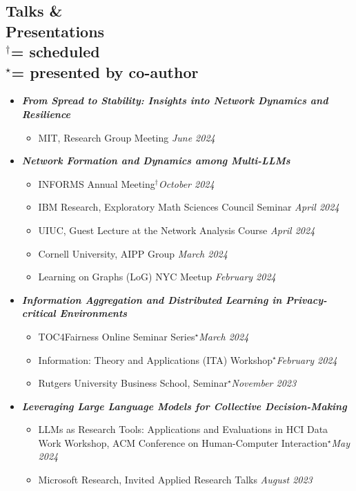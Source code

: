 \documentclass[margin]{res}
\newcommand{\scheduled}[0]{\ensuremath {^\dagger}}
\newcommand{\presentedbycoauthor}[0]{\ensuremath {^{\star}}}
\newcommand{\bemph}[1]{\textbf{\emph{#1}}}
\begin{document}
\begin{resume}
\section{Talks \& \\ Presentations \\
\footnotesize
\scheduled  = \textup{scheduled} \\ \presentedbycoauthor = \textup{presented by co-author}
}

\begin{itemize}[nosep]
	\item \bemph{From Spread to Stability: Insights into Network Dynamics and Resilience}
	\begin{itemize}[nosep]
		\item MIT, Research Group Meeting \hfill \emph{June 2024}
	\end{itemize}

	\item \bemph{Network Formation and Dynamics among Multi-LLMs}
	\begin{itemize}[nosep]
		\item INFORMS Annual Meeting\scheduled \hfill \emph{October 2024}
		\item IBM Research, Exploratory Math Sciences Council Seminar  \hfill \emph{April 2024} 
		\item UIUC, Guest Lecture at the Network Analysis Course \hfill \emph{April 2024}
		\item Cornell University, AIPP Group \hfill \emph{March 2024}
		\item Learning on Graphs (LoG) NYC Meetup \hfill \emph{February 2024}
	\end{itemize}
	
	\item \bemph{Information Aggregation and Distributed Learning in Privacy-critical Environments}
	\begin{itemize}[nosep]
	\item  TOC4Fairness Online Seminar Series\presentedbycoauthor \hfill \emph{March 2024}
	\item Information: Theory and Applications (ITA) Workshop\presentedbycoauthor \hfill \emph{February 2024}
	\item Rutgers University Business School, Seminar\presentedbycoauthor \hfill \emph{November 2023}	
	\end{itemize}

	\item \bemph{Leveraging Large Language Models for Collective Decision-Making}
	\begin{itemize}[nosep]
		\item LLMs as Research Tools: Applications and Evaluations in HCI Data Work Workshop, ACM Conference on Human-Computer Interaction\presentedbycoauthor \hfill \emph{May 2024}
		\item Microsoft Research, Invited Applied Research Talks \hfill \emph{August 2023}
	\end{itemize}


\end{itemize}
\end{resume}
\end{document}
